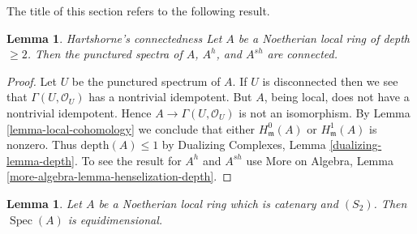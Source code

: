 \documentclass{stacks-project}
\newenvironment{reference}{\comment}{\endcomment}
\newenvironment{slogan}{\comment}{\endcomment}
\theoremstyle{plain}
\newtheorem{lemma}[subsection]{Lemma}
\theoremstyle{definition}
\theoremstyle{remark}
\numberwithin{equation}{subsection}
\def\Spec{\mathop{\mathrm{Spec}}}
\begin{document}
\noindent
The title of this section refers to the following result.

\begin{lemma}
\label{lemma-depth-2-connected-punctured-spectrum}
\begin{reference}
\cite[Proposition 2.1]{Hartshorne-connectedness}
\end{reference}
\begin{slogan}
Hartshorne's connectedness
\end{slogan}
Let $A$ be a Noetherian local ring of depth $\geq 2$.
Then the punctured spectra of $A$, $A^h$, and $A^{sh}$ are connected.
\end{lemma}

\begin{proof}
Let $U$ be the punctured spectrum of $A$.
If $U$ is disconnected then we see that
$\Gamma(U, \mathcal{O}_U)$ has a nontrivial idempotent.
But $A$, being local, does not have a nontrivial idempotent.
Hence $A \to \Gamma(U, \mathcal{O}_U)$ is not an isomorphism.
By Lemma \ref{lemma-local-cohomology}
we conclude that either $H^0_\mathfrak m(A)$ or $H^1_\mathfrak m(A)$
is nonzero. Thus $\text{depth}(A) \leq 1$ by
Dualizing Complexes, Lemma \ref{dualizing-lemma-depth}.
To see the result for $A^h$ and $A^{sh}$ use
More on Algebra, Lemma \ref{more-algebra-lemma-henselization-depth}.
\end{proof}

\begin{lemma}
\label{lemma-catenary-S2-equidimensional}
\begin{reference}
\cite[IV Corollary 5.10.9]{EGA}
\end{reference}
Let $A$ be a Noetherian local ring which is catenary and $(S_2)$.
Then $\Spec(A)$ is equidimensional.
\end{lemma}
\end{document}
